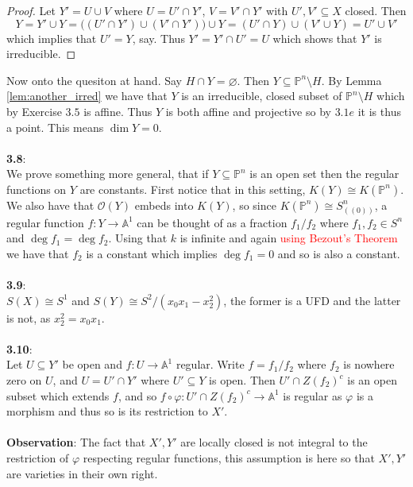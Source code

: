 \documentclass[12pt]{article}
\numberwithin{thm}{subsection}
\numberwithin{defn}{subsection}
\numberwithin{lemma}{subsection}
\numberwithin{example}{subsection}
\numberwithin{notation}{subsection}
\numberwithin{cor}{subsection}
\numberwithin{remark}{subsection}
\numberwithin{condition}{subsection}
\numberwithin{question}{subsection}
\numberwithin{construction}{subsection}
\numberwithin{construction}{subsection}
\numberwithin{construction}{subsection}
\newcommand{\bb}[1]{\mathbb{#1}}
\newcommand{\call}[1]{\mathcal{#1}}
\newcommand{\lto}{\longrightarrow}
\begin{document}
\begin{proof}
    Let $Y' = U \cup V$ where $U = U' \cap Y'$, $V = V' \cap Y'$ with $U',V' \subseteq X$ closed. Then
    \[Y = Y' \cup Y = \big( (U' \cap Y') \cup (V' \cap Y')\big) \cup Y = (U' \cap Y) \cup (V' \cup Y) = U' \cup V'\]
    which implies that $U'= Y$, say. Thus $Y' = Y' \cap U' = U$ which shows that $Y'$ is irreducible.
    \end{proof}
Now onto the quesiton at hand. Say $H \cap Y = \varnothing$. Then $Y \subseteq \bb{P}^n\setminus H$. By Lemma \ref{lem:another_irred} we have that $Y$ is an irreducible, closed subset of $\bb{P}^n\setminus H$ which by Exercise $3.5$ is affine. Thus $Y$ is both affine and projective so by $3.1e$ it is thus a point. This means $\operatorname{dim}Y = 0$.\\\\
%
\textbf{3.8}:\\
We prove something more general, that if $Y \subseteq \bb{P}^n$ is an open set then the regular functions on $Y$ are constants. First notice that in this setting, $K(Y) \cong K(\bb{P}^n)$. We also have that $\call{O}(Y)$ embeds into $K(Y)$, so since $K(\bb{P}^n) \cong S^n_{((0))}$, a regular function $f: Y \lto \bb{A}^1$ can be thought of as a fraction $f_1/f_2$ where $f_1,f_2 \in S^n$ and $\operatorname{deg}f_1 = \operatorname{deg}f_2$. Using that $k$ is infinite and again \textcolor{red}{using Bezout's Theorem} we have that $f_2$ is a constant which implies $\operatorname{deg}f_1 = 0$ and so is also a constant.\\\\
%
\textbf{3.9}:\\
$S(X) \cong S^1$ and $S(Y) \cong S^2/(x_0x_1 - x_2^2)$, the former is a UFD and the latter is not, as $x_2^2 = x_0x_1$.\\\\
%
\textbf{3.10}:\\
Let $U \subseteq Y'$ be open and $f: U \lto \bb{A}^1$ regular. Write $f = f_1/f_2$ where $f_2$ is nowhere zero on $U$, and $U = U' \cap Y'$ where $U' \subseteq Y$ is open. Then $U' \cap Z(f_2)^c$ is an open subset which extends $f$, and so $f \circ \varphi: U' \cap Z(f_2)^c \lto \bb{A}^1$ is regular as $\varphi$ is a morphism and thus so is its restriction to $X'$.\\\\
%
\textbf{Observation}: The fact that $X',Y'$ are locally closed is not integral to the restriction of $\varphi$ respecting regular functions, this assumption is here so that $X',Y'$ are varieties in their own right.\\\\
\end{document}
